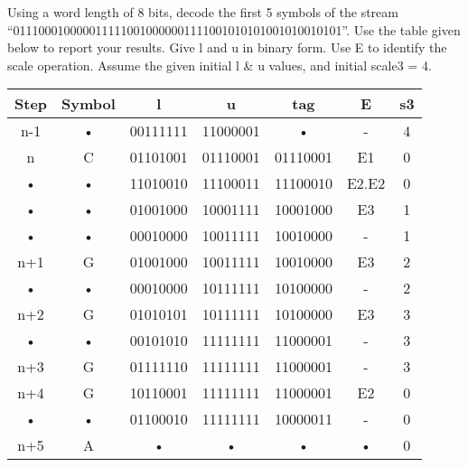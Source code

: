 \begin{question}
Using a word length of 8 bits, decode the first 5 symbols of the stream
“0111000100000111110010000001111001010101001010010101”. Use the table given below to
report your results. Give l and u in binary form. Use E to identify the scale operation. Assume the
given initial l \& u values, and initial scale3 = 4.
\end{question}
\begin{solution}
\begin{tabular}{|c|c|c|c|c|c|c|}
\hline 
Step & Symbol & l & u & tag & E & s3 \\ 
\hline 
n-1 & • & 00111111 & 11000001 & • & - & 4 \\ 
\hline 
n & C & 01101001 & 01110001 & 01110001 & E1 & 0 \\ 
\hline 
• & • & 11010010 & 11100011 & 11100010 & E2.E2 & 0 \\ 
\hline 
• & • & 01001000 & 10001111 & 10001000 & E3 & 1 \\ 
\hline 
• & • & 00010000 & 10011111 & 10010000 & - & 1 \\ 
\hline 
n+1 & G & 01001000 & 10011111 & 10010000 & E3 & 2 \\ 
\hline 
• & • & 00010000 & 10111111 & 10100000 & - & 2 \\ 
\hline 
n+2 & G & 01010101 & 10111111 & 10100000 & E3 & 3 \\ 
\hline 
• & • & 00101010 & 11111111 & 11000001 & - & 3 \\ 
\hline 
n+3 & G & 01111110 & 11111111 & 11000001 & - & 3 \\ 
\hline 
n+4 & G & 10110001 & 11111111 & 11000001 & E2 & 0 \\ 
\hline 
• & • & 01100010 & 11111111 & 10000011 & - & 0 \\ 
\hline 
n+5 & A & • & • & • & • & 0 \\ 
\hline 
\end{tabular} 
\end{solution}
